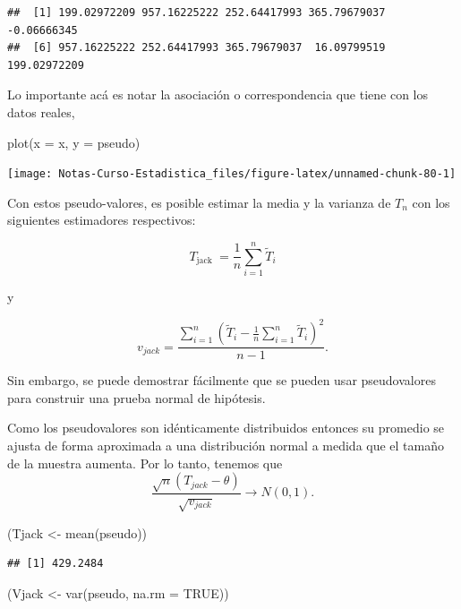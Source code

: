\documentclass[
  12pt,
]{book}
\newenvironment{Shaded}{\begin{snugshade}}{\end{snugshade}}
\newcommand{\AttributeTok}[1]{\textcolor[rgb]{0.77,0.63,0.00}{#1}}
\newcommand{\ConstantTok}[1]{\textcolor[rgb]{0.00,0.00,0.00}{#1}}
\newcommand{\FunctionTok}[1]{\textcolor[rgb]{0.00,0.00,0.00}{#1}}
\newcommand{\NormalTok}[1]{#1}
\newcommand{\OtherTok}[1]{\textcolor[rgb]{0.56,0.35,0.01}{#1}}
\begin{document}
\begin{verbatim}
##  [1] 199.02972209 957.16225222 252.64417993 365.79679037  -0.06666345
##  [6] 957.16225222 252.64417993 365.79679037  16.09799519 199.02972209
\end{verbatim}

Lo importante acá es notar la asociación o correspondencia que tiene con
los datos reales,

\begin{Shaded}
\begin{Highlighting}[]
\FunctionTok{plot}\NormalTok{(}\AttributeTok{x =}\NormalTok{ x, }\AttributeTok{y =}\NormalTok{ pseudo)}
\end{Highlighting}
\end{Shaded}

\begin{center}\texttt{[image: Notas-Curso-Estadistica\_files/figure-latex/unnamed-chunk-80-1]} \end{center}

Con estos pseudo-valores, es posible estimar la media y la varianza de
\(T_{n}\) con los siguientes estimadores respectivos:

\[
T_{\text {jack }}=\frac{1}{n} \sum_{i=1}^{n} \widetilde{T}_{i}
\]

y

\[
v_{jack}=\frac{\sum_{i=1}^{n}\left(\widetilde{T}_{i}-\frac{1}{n}
\sum_{i=1}^{n} \widetilde{T}_{i}\right)^{2}}{n-1}.
\]

Sin embargo, se puede demostrar fácilmente que se pueden usar
pseudovalores para construir una prueba normal de hipótesis.

Como los pseudovalores son idénticamente distribuidos entonces su
promedio se ajusta de forma aproximada a una distribución normal a
medida que el tamaño de la muestra aumenta. Por lo tanto, tenemos que \[
  \frac{\sqrt{n}\left(T_{jack}-\theta\right)}{\sqrt{v_{jack}}}
  \rightarrow N(0,1).
\]

\begin{Shaded}
\begin{Highlighting}[]
\NormalTok{(Tjack }\OtherTok{\textless{}{-}} \FunctionTok{mean}\NormalTok{(pseudo))}
\end{Highlighting}
\end{Shaded}

\begin{verbatim}
## [1] 429.2484
\end{verbatim}

\begin{Shaded}
\begin{Highlighting}[]
\NormalTok{(Vjack }\OtherTok{\textless{}{-}} \FunctionTok{var}\NormalTok{(pseudo, }\AttributeTok{na.rm =} \ConstantTok{TRUE}\NormalTok{))}
\end{Highlighting}
\end{Shaded}
\end{document}
